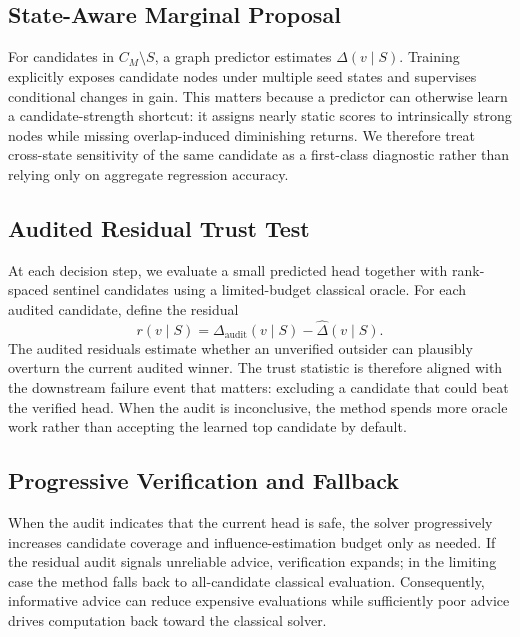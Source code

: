 \subsection{State-Aware Marginal Proposal}
For candidates in $C_M\setminus S$, a graph predictor estimates $\widehat{\Delta}(v\mid S)$. Training explicitly exposes candidate nodes under multiple seed states and supervises conditional changes in gain. This matters because a predictor can otherwise learn a candidate-strength shortcut: it assigns nearly static scores to intrinsically strong nodes while missing overlap-induced diminishing returns. We therefore treat cross-state sensitivity of the same candidate as a first-class diagnostic rather than relying only on aggregate regression accuracy.

\subsection{Audited Residual Trust Test}
At each decision step, we evaluate a small predicted head together with rank-spaced sentinel candidates using a limited-budget classical oracle. For each audited candidate, define the residual
\begin{equation}
    r(v\mid S)=\Delta_{\mathrm{audit}}(v\mid S)-\widehat{\Delta}(v\mid S).
\end{equation}
The audited residuals estimate whether an unverified outsider can plausibly overturn the current audited winner. The trust statistic is therefore aligned with the downstream failure event that matters: excluding a candidate that could beat the verified head. When the audit is inconclusive, the method spends more oracle work rather than accepting the learned top candidate by default.

\subsection{Progressive Verification and Fallback}
When the audit indicates that the current head is safe, the solver progressively increases candidate coverage and influence-estimation budget only as needed. If the residual audit signals unreliable advice, verification expands; in the limiting case the method falls back to all-candidate classical evaluation. Consequently, informative advice can reduce expensive evaluations while sufficiently poor advice drives computation back toward the classical solver.

